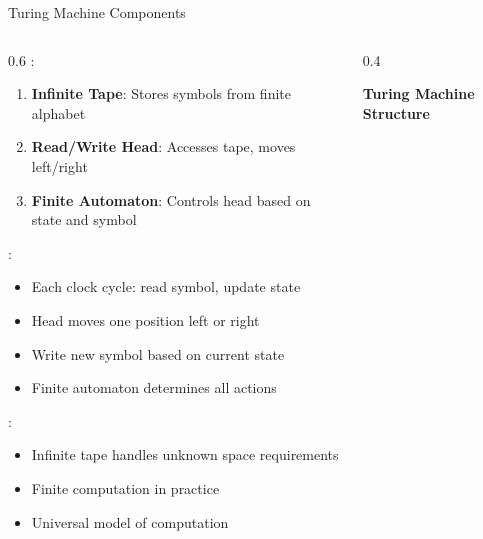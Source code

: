 \begin{frame}{Turing Machine Components}
\begin{columns}
\begin{column}{0.6\textwidth}
:
\begin{enumerate}
\item \textbf{Infinite Tape}: Stores symbols from finite alphabet
\item \textbf{Read/Write Head}: Accesses tape, moves left/right
\item \textbf{Finite Automaton}: Controls head based on state and symbol
\end{enumerate}

\vspace{0.3cm}
:
\begin{itemize}
\item Each clock cycle: read symbol, update state
\item Head moves one position left or right
\item Write new symbol based on current state
\item Finite automaton determines all actions
\end{itemize}

\vspace{0.3cm}
:
\begin{itemize}
\item Infinite tape handles unknown space requirements
\item Finite computation in practice
\item Universal model of computation
\end{itemize}
\end{column}
\begin{column}{0.4\textwidth}
\begin{center}
\textbf{Turing Machine Structure}
\vspace{0.3cm}

\end{center}
\end{column}
\end{columns}
\end{frame}

